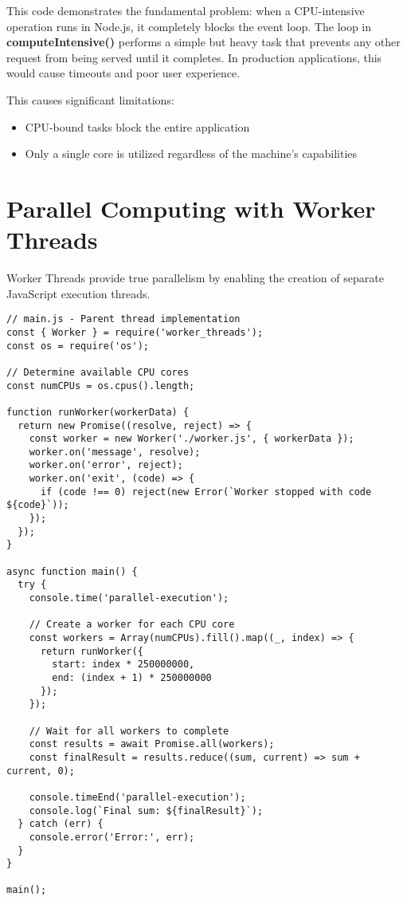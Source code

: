 \documentclass[12pt,letterpaper]{article}
\newenvironment{macterminal}{%
    \begin{mdframed}[
        linecolor=terminalFrame,
        backgroundcolor=terminalBg,
        roundcorner=5pt,
        skipabove=5pt,
        skipbelow=5pt,
        linewidth=1pt,
        innertopmargin=5pt,
        frametitle={%
            \tikz[baseline=(current bounding box.east), outer sep=0pt]{
                \fill[red!80!black] (0,0) circle (5pt);
                \fill[yellow!80!black] (0.7,0) circle (5pt);
                \fill[green!70!black] (1.4,0) circle (5pt);
            }
        },
        frametitlealignment=\raggedright,
        frametitleaboveskip=8pt,
        frametitlebelowskip=0pt,
    ]
}{%
    \end{mdframed}%
}
\begin{document}
This code demonstrates the fundamental problem: when a CPU-intensive operation runs in Node.js, it completely blocks the event loop. The loop in \textbf{\textcolor{accentColor}{computeIntensive()}} performs a simple but heavy task that prevents any other request from being served until it completes. In production applications, this would cause timeouts and poor user experience.

This causes significant limitations:
\begin{itemize}
    \item CPU-bound tasks block the entire application
    \item Only a single core is utilized regardless of the machine's capabilities
\end{itemize}

\section{Parallel Computing with Worker Threads}

Worker Threads provide true parallelism by enabling the creation of separate JavaScript execution threads.

\begin{macterminal}
\begin{lstlisting}
// main.js - Parent thread implementation
const { Worker } = require('worker_threads');
const os = require('os');

// Determine available CPU cores
const numCPUs = os.cpus().length;

function runWorker(workerData) {
  return new Promise((resolve, reject) => {
    const worker = new Worker('./worker.js', { workerData });
    worker.on('message', resolve);
    worker.on('error', reject);
    worker.on('exit', (code) => {
      if (code !== 0) reject(new Error(`Worker stopped with code ${code}`));
    });
  });
}

async function main() {
  try {
    console.time('parallel-execution');
    
    // Create a worker for each CPU core
    const workers = Array(numCPUs).fill().map((_, index) => {
      return runWorker({
        start: index * 250000000,
        end: (index + 1) * 250000000
      });
    });
    
    // Wait for all workers to complete
    const results = await Promise.all(workers);
    const finalResult = results.reduce((sum, current) => sum + current, 0);
    
    console.timeEnd('parallel-execution');
    console.log(`Final sum: ${finalResult}`);
  } catch (err) {
    console.error('Error:', err);
  }
}

main();
\end{lstlisting}
\end{macterminal}
\end{document}
